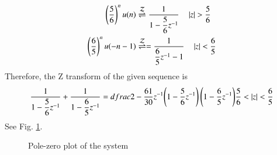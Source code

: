 \begin{align}
    \left(\dfrac{5}{6}\right)^nu(n) &\overset{\mathcal{Z}}{ \rightleftharpoons} \dfrac{1}{1-\dfrac{5}{6}z^{-1}} \quad \left\vert z\right\vert > \frac{5}{6}
\\    \left(\dfrac{6}{5}\right)^nu(-n-1) &\overset{\mathcal{Z}}{ \rightleftharpoons}  
    = \dfrac{1}{\dfrac{6}{5}z^{-1}-1} \quad \left\vert z\right\vert < \frac{6}{5}
\end{align}
Therefore, the Z transform of the given sequence is 
\begin{multline}
    \dfrac{1}{1-\dfrac{5}{6}z^{-1}}+\dfrac{1}{1-\dfrac{6}{5}z^{-1}}\label{ec/2005/6z}
= dfrac{2-\dfrac{61}{30}z^{-1}}{\left(1-\dfrac{5}{6}z^{-1}\right)\left(1-\dfrac{6}{5}z^{-1}\right)}
 \frac{5}{6} < \left\vert z\right\vert < \frac{6}{5}
\end{multline}
See Fig. \ref{ec/2005/6plot}.
\begin{figure}
    \centering
    \caption{Pole-zero plot of the system}
    \label{ec/2005/6plot}
\end{figure}
